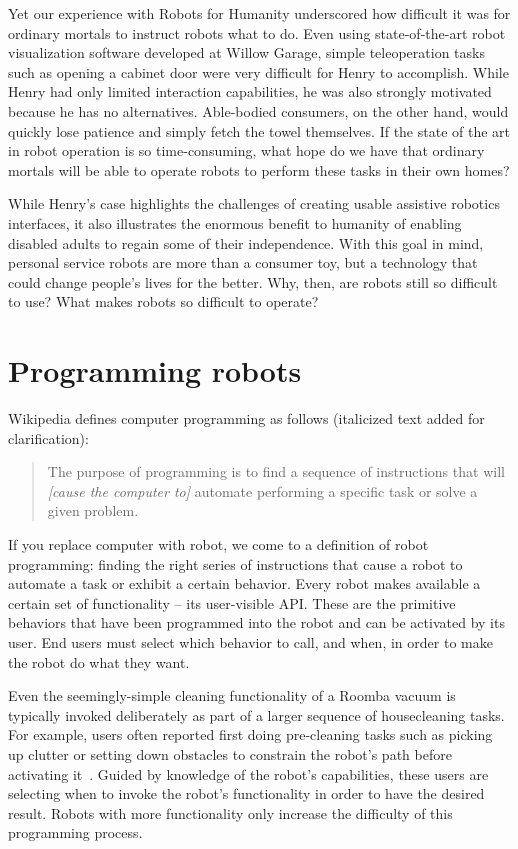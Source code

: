 \documentclass[10pt,twocolumn]{article}
\begin{document}
Yet our experience with Robots for Humanity underscored how difficult it was for ordinary mortals to instruct robots what to do. Even using state-of-the-art robot visualization software developed at Willow Garage, simple teleoperation tasks such as opening a cabinet door were very difficult for Henry to accomplish. While Henry had only limited interaction capabilities, he was also strongly motivated because he has no alternatives. Able-bodied consumers, on the other hand, would quickly lose patience and simply fetch the towel themselves. If the state of the art in robot operation is so time-consuming, what hope do we have that ordinary mortals will be able to operate robots to perform these tasks in their own homes?

While Henry's case highlights the challenges of creating usable assistive robotics interfaces, it also illustrates the enormous benefit to humanity of enabling disabled adults to regain some of their independence. With this goal in mind, personal service robots are more than a consumer toy, but a technology that could change people's lives for the better.  Why, then, are robots still so difficult to use? What makes robots so difficult to operate?

\section{Programming robots}

Wikipedia defines computer programming as follows (italicized text added for clarification):

\begin{quote}
The purpose of programming is to find a sequence of instructions that will {\it [cause the computer to]} automate performing a specific task or solve a given problem.
\end{quote}

If you replace computer with robot, we come to a definition of robot programming: finding the right series of instructions that cause a robot to automate a task or exhibit a certain behavior. Every robot makes available a certain set of functionality -- its user-visible API. These are the primitive behaviors that have been programmed into the robot and can be activated by its user. End users must select which behavior to call, and when, in order to make the robot do what they want.

Even the seemingly-simple cleaning functionality of a Roomba vacuum is typically invoked deliberately as part of a larger sequence of housecleaning tasks.  For example, users often reported first doing pre-cleaning tasks such as picking up clutter or setting down obstacles to constrain the robot's path before activating it~\cite{forlizzi-hri06}. Guided by knowledge of the robot's capabilities, these users are selecting when to invoke the robot's functionality in order to have the desired result.  Robots with more functionality only increase the difficulty of this programming process.
\end{document}
